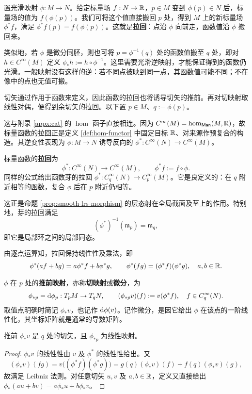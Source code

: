 置光滑映射 $\phi:M\to N$。给定标量场 $f:N\to\mathbb{R}$，$p\in M$ 变到 $\phi(p)\in N$ 后，标量场的值为 $f(\phi(p))$。我们可将这个值直接搬回 $p$ 处，得到 $M$ 上的新标量场 $\phi^*f$，满足 $\phi^*f(p)=f(\phi(p))$。这就是\textbf{拉回}：点沿 $\phi$ 向前走，函数值沿 $\phi$ 搬回来。

类似地，若 $\phi$ 是微分同胚，则也可将 $p=\phi^{-1}(q)$ 处的函数值搬至 $q$ 处，即对 $h\in C^\infty(M)$ 定义 $\phi_*h:=h\circ\phi^{-1}$。这里需要光滑逆映射，才能保证得到的函数仍光滑。一般映射没有这样的逆：若不同点被映到同一点，其函数值可能不同；不在像中的点也无值可搬。

切矢通过作用于函数来定义，因此函数的拉回也将诱导切矢的推前。再对切映射取线性对偶，便得到余切矢的拉回。以下置 $p\in M$、$q:=\phi(p)$。

这与附录 \ref{appx:cat} 的 $\hom$-函子直接相连。因为 $C^\infty(M)=\hom_{\mathsf{Man}}(M,\mathbb{R})$，故标量函数的拉回正是定义 \ref{def:hom-functor} 中固定目标 $\mathbb{R}$、对来源作预复合的构造。其逆变性表现为 $\phi:M\to N$ 诱导反向的 $\phi^*:C^\infty(N)\to C^\infty(M)$。

\begin{definition}
    标量函数的\textbf{拉回}为
    \[
        \phi^*:C^\infty(N)\to C^\infty(M),\qquad \phi^*f:=f\circ\phi.
    \]
    同样的公式给出函数芽的拉回 $\phi^*:C^\infty_q(N)\to C^\infty_p(M)$。它是良定义的：在 $q$ 附近相等的函数，复合 $\phi$ 后在 $p$ 附近仍相等。
\end{definition}

这正是命题 \ref{prop:smooth-lrs-morphism} 的层态射在全局截面及茎上的作用。特别地，芽的拉回满足
\[
    (\phi^*)^{-1}(\mathfrak m_p)=\mathfrak m_q,
\]
即它是局部环之间的局部同态。

由逐点运算知，拉回保持线性性及乘法，即
\[
    \phi^*(af+bg)=a\phi^*f+b\phi^*g,\qquad
    \phi^*(fg)=(\phi^*f)(\phi^*g),\quad a,b\in\mathbb{R}.
\]

\begin{definition}
    $\phi$ 在 $p$ 处的\textbf{推前映射}，亦称\textbf{切映射}或\textbf{微分}，为
    \[
        \phi_{*p}=\dd\phi_p:T_pM\to T_qN,\qquad
        (\phi_{*p}v)(f):=v(\phi^*f),\quad f\in C^\infty_q(N).
    \]
    取值点明确时简记 $\phi_*v$，也记作 $\dd\phi(v)$。记作微分，是因它给出 $\phi$ 在该点的一阶线性化，其坐标矩阵就是通常的导数矩阵。
\end{definition}

\begin{proposition}
    推前 $\phi_*v$ 是 $q$ 处的切矢，且 $\phi_{*p}$ 为线性映射。
\end{proposition}
\begin{proof}
    $\phi_*v$ 的线性性由 $v$ 及 $\phi^*$ 的线性性给出。又
    \[
        (\phi_*v)(fg)=v\bigl((\phi^*f)(\phi^*g)\bigr)
        =g(q)(\phi_*v)(f)+f(q)(\phi_*v)(g),
    \]
    故满足 Leibniz 法则。对任意切矢 $u,v$ 及 $a,b\in\mathbb{R}$，定义又直接给出 $\phi_*(au+bv)=a\phi_*u+b\phi_*v$。
\end{proof}

